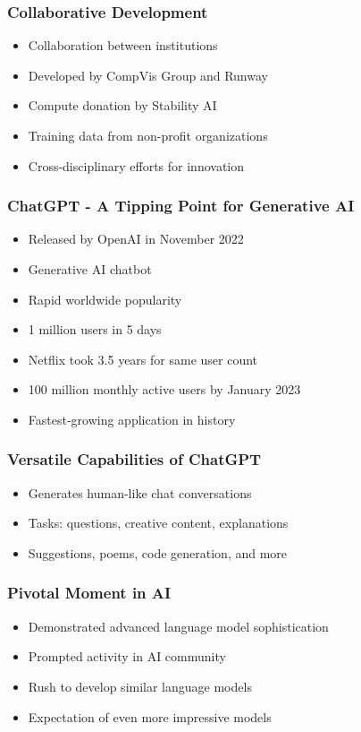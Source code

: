 \begin{frame}[fragile]\frametitle{Collaborative Development}
    
    \begin{itemize}
        \item Collaboration between institutions
        \item Developed by CompVis Group and Runway
        \item Compute donation by Stability AI
        \item Training data from non-profit organizations
        \item Cross-disciplinary efforts for innovation
    \end{itemize}
\end{frame}

\begin{frame}[fragile]\frametitle{ChatGPT - A Tipping Point for Generative AI}
    \begin{itemize}
        \item Released by OpenAI in November 2022
        \item Generative AI chatbot
        \item Rapid worldwide popularity
        \item 1 million users in 5 days
        \item Netflix took 3.5 years for same user count
        \item 100 million monthly active users by January 2023
        \item Fastest-growing application in history
    \end{itemize}
\end{frame}

\begin{frame}[fragile]\frametitle{Versatile Capabilities of ChatGPT}
    \begin{itemize}
        \item Generates human-like chat conversations
        \item Tasks: questions, creative content, explanations
        \item Suggestions, poems, code generation, and more
    \end{itemize}
\end{frame}

\begin{frame}[fragile]\frametitle{Pivotal Moment in AI}
    \begin{itemize}
        \item Demonstrated advanced language model sophistication
        \item Prompted activity in AI community
        \item Rush to develop similar language models
        \item Expectation of even more impressive models
    \end{itemize}
\end{frame}

